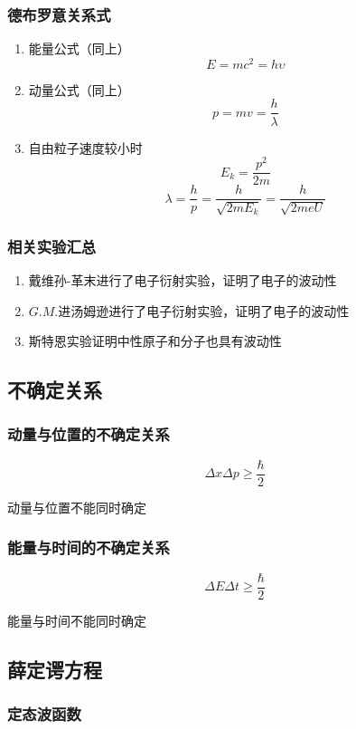 \documentclass{ctexart}
\begin{document}
\subsubsection{德布罗意关系式}
\begin{enumerate}
	\item 能量公式（同上）
    $$E=mc^2=h\upsilon$$
	\item 动量公式（同上）
    $$p=mv=\frac{h}{\lambda}$$
	\item 自由粒子速度较小时
    $$E_k=\frac{p^2}{2m}$$
    $$\lambda=\frac{h}{p}=\frac{h}{\sqrt{2mE_k}}=\frac{h}{\sqrt{2meU}}$$
\end{enumerate}

\subsubsection{相关实验汇总}
\begin{enumerate}
	\item 戴维孙-革末进行了电子衍射实验，证明了电子的波动性
	\item $G.M.$进汤姆逊进行了电子衍射实验，证明了电子的波动性
	\item 斯特恩实验证明中性原子和分子也具有波动性
\end{enumerate}

\subsection{不确定关系}

\subsubsection{动量与位置的不确定关系}

$$\Delta x\Delta p\ge \frac{\hbar}{2}$$

动量与位置不能同时确定

\subsubsection{能量与时间的不确定关系}

$$\Delta E\Delta t\ge \frac{\hbar}{2}$$

能量与时间不能同时确定

\subsection{薛定谔方程}

\subsubsection{定态波函数}
\end{document}
